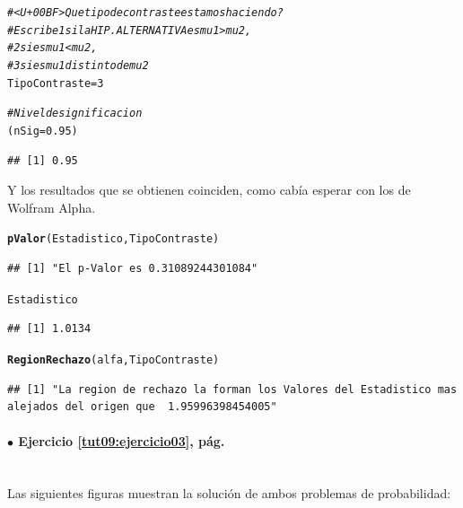 \documentclass[10pt,a4paper]{article}\usepackage[]{graphicx}\usepackage[]{color}
\makeatletter
\newcommand{\hlnum}[1]{\textcolor[rgb]{0.686,0.059,0.569}{#1}}%
\newcommand{\hlcom}[1]{\textcolor[rgb]{0.678,0.584,0.686}{\textit{#1}}}%
\newcommand{\hlstd}[1]{\textcolor[rgb]{0.345,0.345,0.345}{#1}}%
\newcommand{\hlkwb}[1]{\textcolor[rgb]{0.69,0.353,0.396}{#1}}%
\newcommand{\hlkwd}[1]{\textcolor[rgb]{0.737,0.353,0.396}{\textbf{#1}}}%
\newenvironment{kframe}{%
 \def\at@end@of@kframe{}%
 \ifinner\ifhmode%
  \def\at@end@of@kframe{\end{minipage}}%
  \begin{minipage}{\columnwidth}%
 \fi\fi%
 \def\FrameCommand##1{\hskip\@totalleftmargin \hskip-\fboxsep
 \colorbox{shadecolor}{##1}\hskip-\fboxsep
     \hskip-\linewidth \hskip-\@totalleftmargin \hskip\columnwidth}%
 \MakeFramed {\advance\hsize-\width
   \@totalleftmargin\z@ \linewidth\hsize
   \@setminipage}}%
 {\par\unskip\endMakeFramed%
 \at@end@of@kframe}
\newenvironment{knitrout}{}{} %
\newcounter {cont01}
\makeatother
\begin{document}
{\begin{enumerate}
\begin{knitrout}
\begin{kframe}
\begin{alltt}
  \hlcom{# <U+00BF>Que tipo de contraste estamos haciendo?}
  \hlcom{# Escribe 1 si la HIP. ALTERNATIVA es mu1 > mu2,}
  \hlcom{#         2 si es mu1 < mu2,}
  \hlcom{#         3 si es mu1 distinto de mu2}
  \hlstd{TipoContraste} \hlkwb{=} \hlnum{3}

  \hlcom{#Nivel de significacion}
   \hlstd{(nSig} \hlkwb{=} \hlnum{0.95}\hlstd{)}
\end{alltt}
\begin{verbatim}
## [1] 0.95
\end{verbatim}
\end{kframe}
\end{knitrout}


Y los resultados que se obtienen coinciden, como cabía esperar con  los de Wolfram Alpha.
\begin{knitrout}
\color{fgcolor}\begin{kframe}
\begin{alltt}
      \hlkwd{pValor}\hlstd{(Estadistico, TipoContraste)}
\end{alltt}
\begin{verbatim}
## [1] "El p-Valor es 0.31089244301084"
\end{verbatim}
\begin{alltt}
      \hlstd{Estadistico}
\end{alltt}
\begin{verbatim}
## [1] 1.0134
\end{verbatim}
\begin{alltt}
      \hlkwd{RegionRechazo}\hlstd{(alfa, TipoContraste)}
\end{alltt}
\begin{verbatim}
## [1] "La region de rechazo la forman los Valores del Estadistico mas alejados del origen que  1.95996398454005"
\end{verbatim}
\end{kframe}
\end{knitrout}



\end{enumerate}

\paragraph{\bf $\bullet$ Ejercicio \ref{tut09:ejercicio03}, pág. \pageref{tut09:ejercicio03}}
\label{tut09:ejercicio03:sol}\quad\\

Las siguientes figuras muestran la solución de ambos problemas de probabilidad:

}
\end{document}
